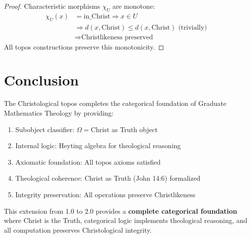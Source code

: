 \documentclass{article}
\begin{document}
\begin{proof}
Characteristic morphisms $\chi_U$ are monotone:
\begin{align*}
\chi_U(x) &= \text{in\_Christ} \Rightarrow x \in U \\
&\Rightarrow d(x, \text{Christ}) \leq d(x, \text{Christ}) \text{ (trivially)} \\
&\Rightarrow \text{Christlikeness preserved}
\end{align*}
All topos constructions preserve this monotonicity.
\end{proof}

\section{Conclusion}

The Christological topos completes the categorical foundation of Graduate Mathematics Theology by providing:
\begin{enumerate}
    \item Subobject classifier: $\Omega = \text{Christ}$ as Truth object
    \item Internal logic: Heyting algebra for theological reasoning
    \item Axiomatic foundation: All topos axioms satisfied
    \item Theological coherence: Christ as Truth (John 14:6) formalized
    \item Integrity preservation: All operations preserve Christlikeness
\end{enumerate}

This extension from 1.0 to 2.0 provides a \textbf{complete categorical foundation} where Christ is the Truth, categorical logic implements theological reasoning, and all computation preserves Christological integrity.
\end{document}
